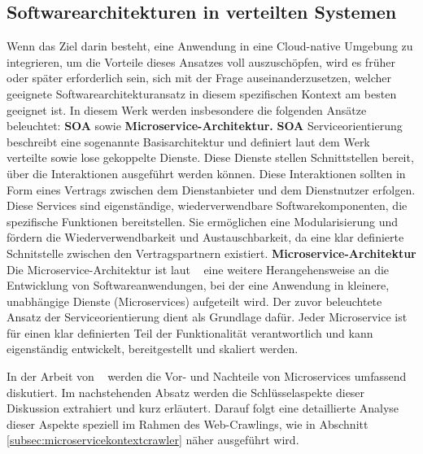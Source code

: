 \subsection{Softwarearchitekturen in verteilten Systemen} \label{subsec:monoservmicro}
Wenn das Ziel darin besteht, eine Anwendung in eine Cloud-native Umgebung zu integrieren, um die Vorteile dieses Ansatzes voll auszuschöpfen, wird es früher oder später erforderlich sein, sich mit der Frage auseinanderzusetzen, welcher geeignete Softwarearchitekturansatz in diesem spezifischen Kontext am besten geeignet ist. In diesem Werk werden insbesondere die folgenden Ansätze beleuchtet: \textbf{\acl{SOA}} sowie \textbf{Microservice-Architektur.}\newline\newline
\textbf{\acl{SOA}}\newline
Serviceorientierung beschreibt eine sogenannte Basisarchitektur und definiert laut dem Werk ~\parencite[vgl.][]{Gharbi_Koschel_Rausch_Starke_2023}{}{} verteilte sowie lose gekoppelte Dienste. Diese Dienste stellen Schnittstellen bereit, über die Interaktionen ausgeführt werden können. Diese Interaktionen sollten in Form eines Vertrags zwischen dem Dienstanbieter und dem Dienstnutzer erfolgen. Diese Services sind eigenständige, wiederverwendbare Softwarekomponenten, die spezifische Funktionen bereitstellen. Sie ermöglichen eine Modularisierung und fördern die Wiederverwendbarkeit und Austauschbarkeit, da eine klar definierte Schnitstelle zwischen den Vertragspartnern existiert.\newline\newline
\textbf{Microservice-Architektur}\newline
    Die Microservice-Architektur ist laut ~\parencite[vgl.][S. 6]{Wolff_2018} eine weitere Herangehensweise an die Entwicklung von Softwareanwendungen, bei der eine Anwendung in kleinere, unabhängige Dienste (Microservices) aufgeteilt wird. Der zuvor beleuchtete Ansatz der Serviceorientierung dient als Grundlage dafür. Jeder Microservice ist für einen klar definierten Teil der Funktionalität verantwortlich und kann eigenständig entwickelt, bereitgestellt und skaliert werden.

In der Arbeit von ~\parencite[vgl.][S. 14-17]{Wolff_2018} werden die Vor- und Nachteile von Microservices umfassend diskutiert. Im nachstehenden Absatz werden die Schlüsselaspekte dieser Diskussion extrahiert und kurz erläutert. Darauf folgt eine detaillierte Analyse dieser Aspekte speziell im Rahmen des Web-Crawlings, wie in Abschnitt \ref{subsec:microservicekontextcrawler} näher ausgeführt wird.

